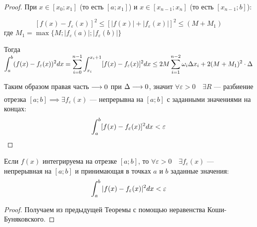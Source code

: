 \begin{proof}
    При $x \in [x_0; x_1]$ (то есть $[a; x_1]$) и 
    $x \in [x_{n - 1}; x_n]$ (то есть $[x_{n - 1}; b]$):

    \[ [f(x) - f_\varepsilon(x)]^2 \leq [|f(x)| + |f_\varepsilon(x)|]^2 \leq (M + M_1) \]
    где $M_1 = \max \{ M; |f_\varepsilon(a)|; |f_\varepsilon(b)| \}$

    Тогда $\displaystyle\int_a^b (f(x) - f_\varepsilon(x))^2 dx = 
    \displaystyle\sum_{i = 0}^{n - 1} \displaystyle\int_{x_i}^{x_i + 1} [f(x) - f_\varepsilon(x)]^2 dx \leq
    2M \displaystyle\sum_{i = 1}^{n - 2} \omega_i \Delta x_i + 2(M + M_1)^2 \cdot \Delta$

    Таким образом правая часть $\underset{}{\longrightarrow} 0$ при $\Delta \underset{}{\longrightarrow} 0$,
    значит $\forall \varepsilon > 0 \quad \exists R$ --- разбиение отрезка
    $[a; b] \implies \exists f_\varepsilon(x)$ --- непрерывна на $[a; b]$ с
    заданными значениями на концах:
    \[ \displaystyle\int_a^b [f(x) - f_\varepsilon(x)]^2 dx < \varepsilon \]
\end{proof}

\begin{corollary}
    Если $f(x)$ интегрируема на отрезке $[a; b]$, то $\forall \varepsilon > 0
    \quad \exists f_\varepsilon(x)$ --- непрерывная на $[a; b]$ и принимающая
    в точках $a$ и $b$ заданные значения:
    \[ \displaystyle\int_a^b |f(x) - f_\varepsilon(x)|^2 dx < \varepsilon \]
\end{corollary}
\begin{proof}
    Получаем из предыдущей Теоремы с помощью неравенства Коши-Буняковского.
\end{proof}
